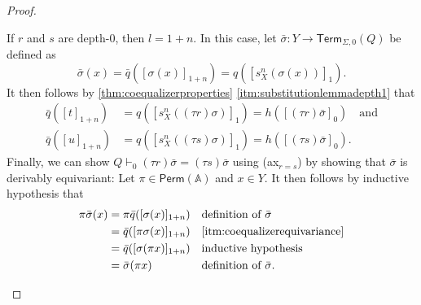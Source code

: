 \documentclass[a4paper,UKenglish,cleveref,thm-restate,numberwithinsect,final]{lipics-v2021}
\newcommand{\Perm}{\mathsf{Perm}(\Names)}
\newcommand{\Term}{\mathsf{Term}}
\newcommand{\sig}{\Sigma}
\newcommand{\Names}{\mathbb{A}}
\theoremstyle{plain}
\numberwithin{equation}{section}
\newcommand{\+}[1]{\mathcal{#1}\xspace}
\theoremstyle{definition}
\begin{document}
\begin{proof}
\begin{enumerate}[wide]
\begin{itemize}
                    If \(r\) and \(s\) are depth-0, then \(l = 1 + n\).
                    In this case, let \(\bar{\sigma}: Y \to \Term_{\sig, 0}(Q)\) be defined as
                    \[
                        \bar{\sigma}(x) = \bar{q}([\sigma(x)]_{1 + n}) = q([s^n_X(\sigma(x))]_1).
                    \]
                    It then follows by \cref{thm:coequalizerproperties} \eqref{itm:substitutionlemmadepth1} that
                    \begin{align*}
                        \bar{q}([t]_{1 + n}) &= q([s^n_X((\tau r)\sigma)]_1) = h([(\tau r)\bar{\sigma}]_0) \quad \text{and} \\
                        \bar{q}([u]_{1 + n}) &= q([s^n_X((\tau s)\sigma)]_1) = h([(\tau s)\bar{\sigma}]_0).
                    \end{align*}
                    Finally, we can show \(Q \vdash_0 (\tau r)\bar{\sigma} = (\tau s)\bar{\sigma}\) using (ax$_{r = s}$) by showing that \(\bar{\sigma}\) is derivably equivariant:
                    Let \(\pi \in \Perm\) and \(x \in Y\).
                    It then follows by inductive hypothesis that
                    \begin{align*}
                        \pi\bar{\sigma}(x)
                        &= \pi\bar{q}([\sigma(x)]_{1 + n}) && \text{definition of } \bar{\sigma} \\
                        &= \bar{q}([\pi \sigma(x)]_{1 + n}) && \text{\eqref{itm:coequalizerequivariance}} \\
                        &= \bar{q}([\sigma(\pi x)]_{1 + n}) && \text{inductive hypothesis} \\
                        &= \bar{\sigma}(\pi x) && \text{definition of } \bar{\sigma}.
                    \end{align*}


\end{itemize}
\end{enumerate}
\end{proof}
\end{document}

